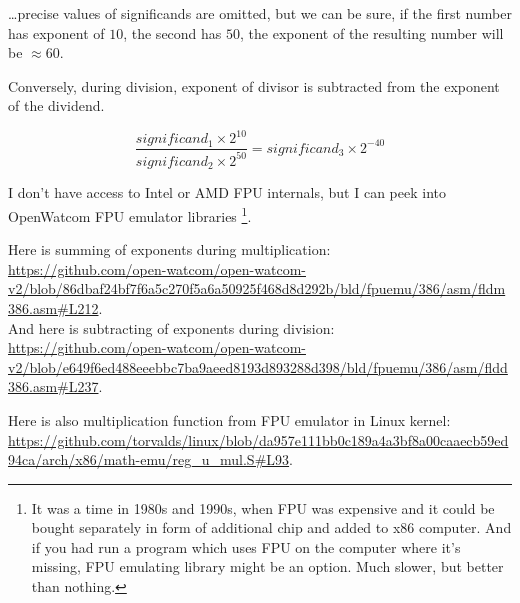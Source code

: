 \dots precise values of significands are omitted, but we can be sure, if the first number has exponent of $10$, the second has $50$,
the exponent of the resulting number will be $\approx 60$.

Conversely, during division, exponent of divisor is subtracted from the exponent of the dividend.

\begin{equation}
\frac{significand_{1} \times 2^{10}}{significand_{2} \times 2^{50}} = significand_{3} \times 2^{-40}
\end{equation}

I don't have access to Intel or AMD FPU internals, but I can peek into OpenWatcom FPU emulator libraries
\footnote{It was a time in 1980s and 1990s, when FPU was expensive and it could be bought separately 
in form of additional chip and added to x86 computer.
And if you had run a program which uses FPU on the computer where it's missing, FPU emulating library might be an option.
Much slower, but better than nothing.}.

Here is summing of exponents during multiplication:\\
\url{https://github.com/open-watcom/open-watcom-v2/blob/86dbaf24bf7f6a5c270f5a6a50925f468d8d292b/bld/fpuemu/386/asm/fldm386.asm\#L212}.\\
And here is subtracting of exponents during division:\\
\url{https://github.com/open-watcom/open-watcom-v2/blob/e649f6ed488eeebbc7ba9aeed8193d893288d398/bld/fpuemu/386/asm/fldd386.asm\#L237}.

Here is also multiplication function from FPU emulator in Linux kernel:
\url{https://github.com/torvalds/linux/blob/da957e111bb0c189a4a3bf8a00caaecb59ed94ca/arch/x86/math-emu/reg_u_mul.S\#L93}.




